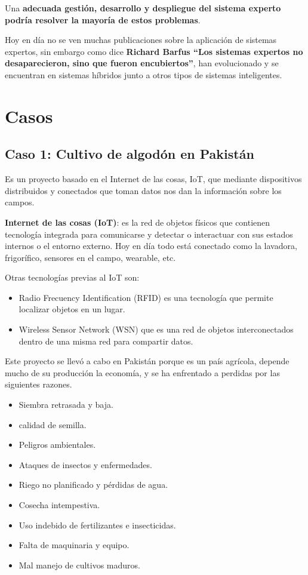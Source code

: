 \documentclass[12pt, twoside, openright]{report} %
\begin{document}
Una \textbf{adecuada gestión, desarrollo y despliegue del sistema experto podría resolver la mayoría de estos problemas}.

Hoy en día no se ven muchas publicaciones sobre la aplicación de sistemas expertos, sin embargo como dice \textbf{Richard Barfus “Los sistemas expertos no desaparecieron, sino que fueron encubiertos”}, han evolucionado y se encuentran en sistemas híbridos junto a otros tipos de sistemas inteligentes.

\section{Casos}
\subsection{Caso 1: Cultivo de algodón en Pakistán}
Es un proyecto basado en el Internet de las cosas, IoT, que mediante dispositivos distribuidos y conectados que toman datos nos dan la información sobre los campos.

\textbf{Internet de las cosas (IoT)}: es la red de objetos físicos que contienen tecnología integrada para comunicarse y detectar o interactuar con sus estados internos o el entorno externo. Hoy en día todo está conectado como la lavadora, frigorífico, sensores en el campo, wearable, etc.

Otras tecnologías previas al IoT son:
\begin{itemize}
	\item Radio Frecuency Identification (RFID) es una tecnología que permite localizar objetos en un lugar.
	\item Wireless Sensor Network (WSN) que es una red de objetos interconectados dentro de una misma red para compartir datos.
\end{itemize}

Este proyecto se llevó a cabo en Pakistán porque es un país agrícola, depende mucho de su producción la economía, y se ha enfrentado a perdidas por las siguientes razones.
\begin{itemize}
	\item Siembra retrasada y baja.
	\item calidad de semilla.
	\item Peligros ambientales.
	\item Ataques de insectos y enfermedades.
	\item Riego no planificado y pérdidas de agua.
	\item Cosecha intempestiva.
	\item Uso indebido de fertilizantes e insecticidas.
	\item Falta de maquinaria y equipo.
	\item Mal manejo de cultivos maduros.
\end{itemize}
\end{document}
